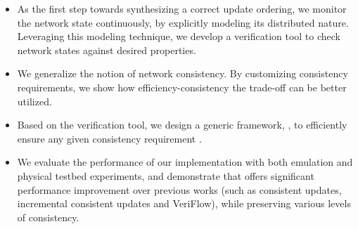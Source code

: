 \begin{itemize}[noitemsep,topsep=0pt,leftmargin=*]
\item As the first step towards synthesizing a correct update ordering, we monitor the network state continuously,
  by explicitly modeling its distributed nature.
Leveraging this modeling technique, we develop a verification tool to check network states against desired properties.

\item We generalize the notion of network consistency. By customizing consistency requirements, we show how efficiency-consistency the trade-off can be better utilized. 

\item Based on the verification tool, we design a generic framework, \name, to efficiently ensure any given consistency requirement .


\item We evaluate the performance of our \name implementation with both emulation and physical testbed experiments, and demonstrate that \name offers significant performance improvement over previous works (such as consistent updates, incremental consistent updates and VeriFlow), while preserving various levels of consistency. 
\end{itemize}
